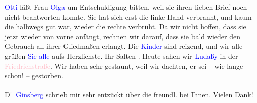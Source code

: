\pstart
           \textcolor{blue}{Otti}{}\ledrightnote{\textcolor{blue}{Ottilie Salten}} läßt Frau \textcolor{blue}{Olga}{}\ledrightnote{\textcolor{blue}{Olga Schnitzler}} um Entschuldigung bitten, weil sie ihren lieben Brief
               noch nicht beantworten konnte. Sie hat sich erst die linke Hand verbrannt, und kaum
               die halbwegs gut war, wieder die rechte verbrüht. Da wir nicht hoffen, dass sie jetzt
               wieder von vorne anfängt, rechnen wir darauf, dass sie bald wieder den Gebrauch all
               ihrer Gliedmaßen erlangt. Die \textcolor{blue}{Kinder}{}\ledrightnote{{$\rightarrow$}\textcolor{blue}{Anna Katharina Rehmann}{\newline}{$\rightarrow$}\textcolor{blue}{Paul Salten}} sind reizend, und wir alle grüßen \textcolor{blue}{Sie alle}{}\ledrightnote{{$\rightarrow$}\textcolor{blue}{Olga Schnitzler}{\newline}{$\rightarrow$}\textcolor{blue}{Heinrich Schnitzler}} aufs Herzlichste.\pend
           \pstart Ihr \spacefill\mbox{Salten}\pend{}
\pstart
           \noindent{}\label{K_L03422-7v}\label{K_L03422-7h}. Heute sahen wir \textcolor{blue}{Ludaßy}{}\ledrightnote{\textcolor{blue}{Julius von Gans-Ludassy}} in der \textcolor{pink}{Friedrichstraße}{}\ledrightnote{\textcolor{pink}{Friedrichstraße}}. Wir haben sehr gestaunt, weil wir dachten, er sei – wie
                  lange schon! – gestorben.\pend
           
\pstart
           D\textsuperscript{r} \textcolor{blue}{Ginsberg}{}\ledrightnote{\textcolor{blue}{Herbert Ginsberg}}
                  schrieb mir sehr entzückt über die freundl. \label{K_L03422-8v}\label{K_L03422-8h} bei Ihnen. Vielen Dank!\pend
           \endnumbering{}  
      